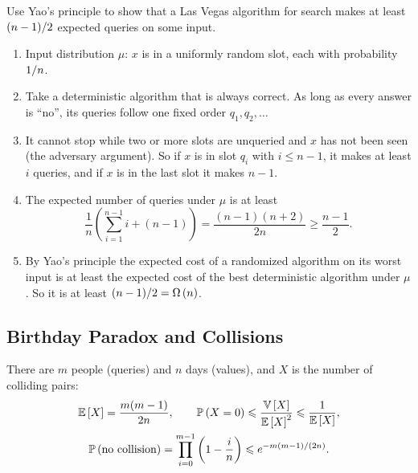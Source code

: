 \begin{exercisebox}
\begin{pproblem}\label{pp:yao-lv}
    Use Yao's principle to show that a Las Vegas algorithm for search makes at least
    $(n-1)/2$ expected queries on some input.
\end{pproblem}
\tcblower
\begin{wsolution}
    \leavevmode
    \begin{enumerate}
        \item Input distribution $\mu$: $x$ is in a uniformly random slot, each with probability
              $1/n$.
        \item Take a deterministic algorithm that is always correct. As long as every answer is
              ``no'', its queries follow one fixed order $q_1, q_2, \dots$
        \item It cannot stop while two or more slots are unqueried and $x$ has not been seen (the
              adversary argument). So if $x$ is in slot $q_i$ with $i \leq n - 1$, it makes at least
              $i$ queries, and if $x$ is in the last slot it makes $n - 1$.
        \item The expected number of queries under $\mu$ is at least
              \[\frac{1}{n} \left(\sum_{i=1}^{n-1} i + (n-1)\right) = \frac{(n-1)(n+2)}{2n} \geq \frac{n-1}{2}.\]
        \item By Yao's principle the expected cost of a randomized algorithm on its worst input is
              at least the expected cost of the best deterministic algorithm under $\mu$. So it is
              at least $(n-1)/2 = \Omega\left(n\right)$. \qedhere
    \end{enumerate}
\end{wsolution}
\end{exercisebox}


\subsection{Birthday Paradox and Collisions}

There are $m$ people (queries) and $n$ days (values), and $X$ is the number of colliding pairs:
\begin{gather*}
    \operatorname{\mathbb{E}}\left[X\right] = \frac{m(m-1)}{2n},
    \qquad
    \operatorname{\mathbb{P}}\left(X = 0\right) \leqslant \frac{\operatorname{\mathbb{V}}\left[X\right]}{\operatorname{\mathbb{E}}\left[X\right]^2} \leqslant \frac{1}{\operatorname{\mathbb{E}}\left[X\right]}, \\
    \operatorname{\mathbb{P}}\left(\text{no collision}\right) = \prod_{i=0}^{m-1} \left(1 - \frac{i}{n}\right) \leqslant e^{-m(m-1)/(2n)}.
\end{gather*}

